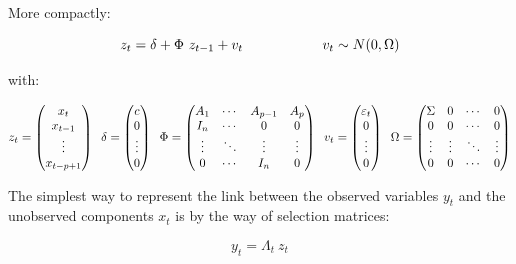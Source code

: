More compactly:

\begin{equation}
z_t =  \delta + \Phi \ z_{t-1} + v_t \hspace{20mm} v_t \sim N(0, \Omega)
\label{equation_c3_s3_ss2_12}
\end{equation}

with:

\begin{equation}
z_t = \left( \begin{matrix} x_{t} \\ x_{t-1} \\ \vdots \\ x_{t-p+1} \end{matrix} \right) \hspace{2mm}
\delta = \left( \begin{matrix} c \\ 0 \\ \vdots \\ 0 \end{matrix} \right) \hspace{2mm}
\Phi = \left( \begin{matrix} A_{1} & \cdots & A_{p-1} & A_{p} \\ I_n & \cdots & 0 & 0 \\ \vdots & \ddots & \vdots & \vdots \\ 0 & \cdots & I_n & 0 \end{matrix} \right) \hspace{2mm}
v_t = \left( \begin{matrix} \varepsilon_t \\ 0 \\ \vdots \\ 0 \end{matrix} \right) \hspace{2mm}
\Omega = \left( \begin{matrix} \Sigma & 0 & \cdots & 0 \\ 0 & 0 & \cdots & 0 \\ \vdots & \vdots & \ddots & \vdots \\ 0 & 0 & \cdots & 0 \end{matrix} \right)
\label{equation_c3_s3_ss2_13}
\end{equation}

The simplest way to represent the link between the observed variables $y_t$ and the unobserved components $x_t$ is by the way of selection matrices:

\begin{equation}
y_t = \Lambda_t \ z_t
\label{equation_c3_s3_ss2_14}
\end{equation}

